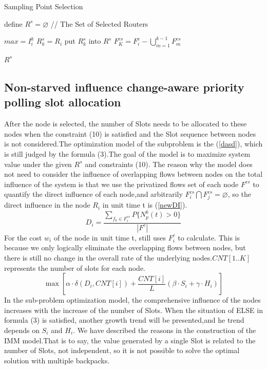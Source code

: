\documentclass[conference,compsoc]{IEEEtran}
\begin{document}
\begin{algorithm}[h]
\caption{Sampling Point Selection}
\begin{algorithmic}[1]

\STATE define $R^s=\varnothing$  //  The Set of Selected Routers


\STATE $max = I_i^k$
\STATE $R^s_k = R_i$
\ENDIF
\ENDFOR
\STATE put $R^s_k$ into $R^s$
\STATE $F_K^{cs} = F_i^c- \bigcup_{m=1}^{k-1}F_m^{cs}$ 
\ENDFOR

\RETURN $R^s$
\label{code:recentEnd}
\end{algorithmic}
\end{algorithm}


 


\subsection{Non-starved influence change-aware priority polling slot allocation}

After the node is selected, the number of Slots needs to be allocated to these nodes when the constraint (10) is satisfied and the Slot sequence between nodes is not considered.The optimization model of the subproblem is the (\ref{dasd}), which is still judged by the formula (3).The goal of the model is to maximize system value under the given $R^s$ and constraints (10). The reason why the model does not need to consider the influence of overlapping flows between nodes on the total influence of the system is that we use the privatized flows set of each node $F^{cs}$ to quantify the direct influence of each node,and arbitrarily $F^{cs}_i \bigcap F^{cs}_j = \varnothing$, so the direct influence in the node $R_i$ in unit time t is (\ref{newDI}).
\begin{equation}
{D}_i=\frac{\sum_{f_k \in F^{cs}_i} P\{N_p^k(t)> 0\}}{|F^c|} 
\label{newDI}
\end{equation}
For the cost $w_i$ of the node in unit time t, still uses $F_i^c$ to calculate. This is because we only logically eliminate the overlapping flows between nodes, but there is still no change in the overall rate of the underlying nodes.$CNT[1..K]$ represents the number of slots for each node.
\begin{equation}
\max [ \alpha \cdot \delta(D_i,CNT[i]) + \frac{CNT[i]}{L}(\beta \cdot S_i + \gamma \cdot H_i)  ]
\label{dasd}
\end{equation}
In the sub-problem optimization model, the comprehensive influence of the nodes increases with the increase of the number of Slots. When the situation of ELSE in formula (3) is satisfied, another growth trend will be presented,and he trend depends on $S_i$ and $H_i$. We have described the reasons in the construction of the IMM model.That is to say, the value generated by a single Slot is related to the number of Slots, not independent, so it is not possible to solve the optimal solution with multiple backpacks.
\end{document}
